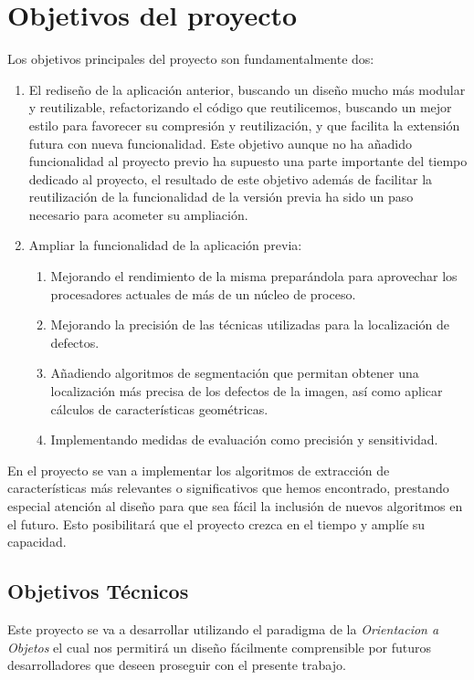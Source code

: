 \chapter{Objetivos del proyecto}

Los objetivos principales del proyecto son fundamentalmente dos:
\begin{enumerate}
 \item El rediseño de la aplicación anterior, buscando un diseño mucho más modular y reutilizable, refactorizando el código que reutilicemos, buscando un mejor estilo para favorecer su compresión y reutilización, y que facilita la extensión futura con nueva funcionalidad. Este objetivo aunque no ha añadido funcionalidad al proyecto previo ha supuesto una parte importante del tiempo dedicado al proyecto, el resultado de este objetivo además de facilitar la reutilización de la funcionalidad de la versión previa ha sido un paso necesario para acometer su ampliación.
 \item Ampliar la funcionalidad de la aplicación previa:
 \begin{enumerate}
 	\item Mejorando el rendimiento de la misma preparándola para aprovechar los procesadores actuales de más de un núcleo de proceso.
	\item Mejorando la precisión de las técnicas utilizadas para la localización de defectos.
	\item Añadiendo algoritmos de segmentación que permitan obtener una localización más precisa de los defectos de la imagen, así como aplicar cálculos de características geométricas.
	\item Implementando medidas de evaluación como precisión y sensitividad.
 \end{enumerate}
	
\end{enumerate}

En el proyecto se van a implementar los algoritmos de extracción de características más relevantes o significativos que hemos encontrado, prestando especial atención al diseño para que sea fácil la inclusión de nuevos algoritmos en el futuro. Esto posibilitará que el proyecto crezca en el tiempo y amplíe su capacidad.

\section{Objetivos Técnicos}
Este proyecto se va a desarrollar utilizando el paradigma de la \textit{Orientacion a Objetos} el cual nos permitirá un diseño fácilmente comprensible por futuros desarrolladores que deseen proseguir con el presente trabajo. 

